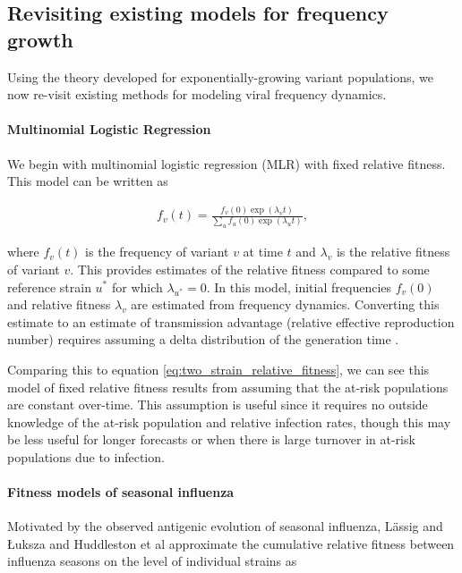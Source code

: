 \documentclass[11pt,oneside,letterpaper]{article}
\begin{document}
\subsection{Revisiting existing models for frequency growth}

Using the theory developed for exponentially-growing variant populations, we now re-visit existing methods for modeling viral frequency dynamics.

\paragraph{Multinomial Logistic Regression}%

We begin with multinomial logistic regression (MLR) with fixed relative fitness.
This model can be written as

\begin{align*}
    f_{v}(t) = \frac{f_{v}(0) \exp(\lambda_{v} t)}{\sum_{u} f_{u}(0) \exp(\lambda_{u} t)},
\end{align*}

where $f_{v}(t)$ is the frequency of variant $v$ at time $t$ and $\lambda_{v}$ is the relative fitness of variant $v$.
This provides estimates of the relative fitness compared to some reference strain $u^{*}$ for which $\lambda_{u^*} = 0$.
In this model, initial frequencies $f_{v}(0)$ and relative fitness $\lambda_{v}$ are estimated from frequency dynamics.
Converting this estimate to an estimate of transmission advantage (relative effective reproduction number) requires assuming a delta distribution of the generation time \cite{Wallinga2006}.

Comparing this to equation \ref{eq:two_strain_relative_fitness}, we can see this model of fixed relative fitness results from assuming that the at-risk populations are constant over-time.
This assumption is useful since it requires no outside knowledge of the at-risk population and relative infection rates, though this may be less useful for longer forecasts or when there is large turnover in at-risk populations due to infection.

\paragraph{Fitness models of seasonal influenza}%

Motivated by the observed antigenic evolution of seasonal influenza, L{\"a}ssig and {\L}uksza \cite{luksza2014predictive} and Huddleston et al \cite{Huddleston2020} approximate the cumulative relative fitness between influenza seasons on the level of individual strains as
\end{document}

